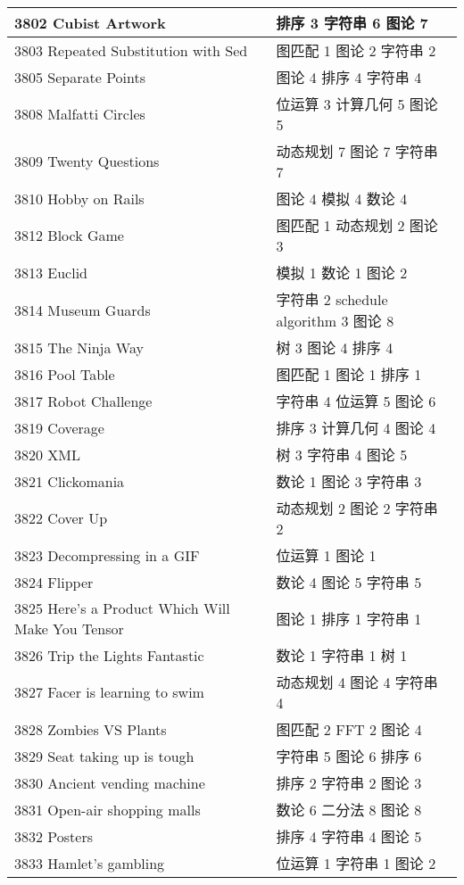 \begin{longtable}{| p{} | p{} |}
 3802 Cubist Artwork  & 排序 3 字符串 6 图论 7 \\ \hline
 3803 Repeated Substitution with Sed  & 图匹配 1 图论 2 字符串 2 \\ \hline
 3805 Separate Points  & 图论 4 排序 4 字符串 4 \\ \hline
 3808 Malfatti Circles  & 位运算 3 计算几何 5 图论 5 \\ \hline
 3809 Twenty Questions  & 动态规划 7 图论 7 字符串 7 \\ \hline
 3810 Hobby on Rails  & 图论 4 模拟 4 数论 4 \\ \hline
 3812 Block Game  & 图匹配 1 动态规划 2 图论 3 \\ \hline
 3813 Euclid  & 模拟 1 数论 1 图论 2 \\ \hline
 3814 Museum Guards  & 字符串 2 schedule algorithm 3 图论 8 \\ \hline
 3815 The Ninja Way  & 树 3 图论 4 排序 4 \\ \hline
 3816 Pool Table  & 图匹配 1 图论 1 排序 1 \\ \hline
 3817 Robot Challenge  & 字符串 4 位运算 5 图论 6 \\ \hline
 3819 Coverage  & 排序 3 计算几何 4 图论 4 \\ \hline
 3820 XML  & 树 3 字符串 4 图论 5 \\ \hline
 3821 Clickomania  & 数论 1 图论 3 字符串 3 \\ \hline
 3822 Cover Up  & 动态规划 2 图论 2 字符串 2 \\ \hline
 3823 Decompressing in a GIF  & 位运算 1 图论 1 \\ \hline
 3824 Flipper  & 数论 4 图论 5 字符串 5 \\ \hline
 3825 Here's a Product Which Will Make You Tensor  & 图论 1 排序 1 字符串 1 \\ \hline
 3826 Trip the Lights Fantastic  & 数论 1 字符串 1 树 1 \\ \hline
 3827 Facer is learning to swim  & 动态规划 4 图论 4 字符串 4 \\ \hline
 3828 Zombies VS Plants  & 图匹配 2 FFT 2 图论 4 \\ \hline
 3829 Seat taking up is tough  & 字符串 5 图论 6 排序 6 \\ \hline
 3830 Ancient vending machine  & 排序 2 字符串 2 图论 3 \\ \hline
 3831 Open-air shopping malls  & 数论 6 二分法 8 图论 8 \\ \hline
 3832 Posters  & 排序 4 字符串 4 图论 5 \\ \hline
 3833 Hamlet's gambling  & 位运算 1 字符串 1 图论 2 \\ \hline

\end{longtable}
